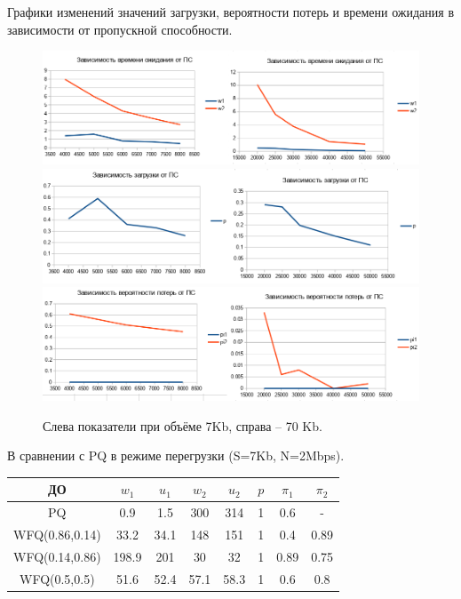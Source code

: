 \documentclass[12pt, a4paper] {ncc}
\begin{document}
		\newpage
		Графики изменений значений загрузки, вероятности потерь и времени ожидания в зависимости от
        пропускной способности.
		\begin{figure}[h!]
			\includegraphics[scale=0.4]{./img/wfq_cmp1.png}
			\includegraphics[scale=0.4]{./img/wfq_cmp2.png}
			\includegraphics[scale=0.4]{./img/wfq_cmp3.png}
			\caption{Слева показатели при объёме 7Kb, справа -- 70 Kb.}
		\end{figure}

		В сравнении с PQ в режиме перегрузки (S=7Kb, N=2Mbps).
		\begin{table}[h!]
			\begin{tabular}{|c|c|c|c|c|c|c|c|}
				\hline
				ДО 		        &		$w_1$	& $u_1$  &  $w_2$   & $u_2$  & $p$   & $\pi_{1}$ &  $\pi_{2}$ \\ \hline
                PQ      		& 0.9           & 1.5    & 300      & 314    & 1     & 0.6       &  -   \\ \hline 
                WFQ(0.86,0.14)  & 33.2          & 34.1   & 148      & 151    & 1     & 0.4       & 0.89 \\ \hline
                WFQ(0.14,0.86)  & 198.9         & 201    & 30       & 32     & 1     & 0.89      & 0.75 \\ \hline
                WFQ(0.5,0.5)    & 51.6          & 52.4   & 57.1     & 58.3   & 1     & 0.6       & 0.8  \\ \hline 
			\end{tabular}
		\end{table}
\end{document}

